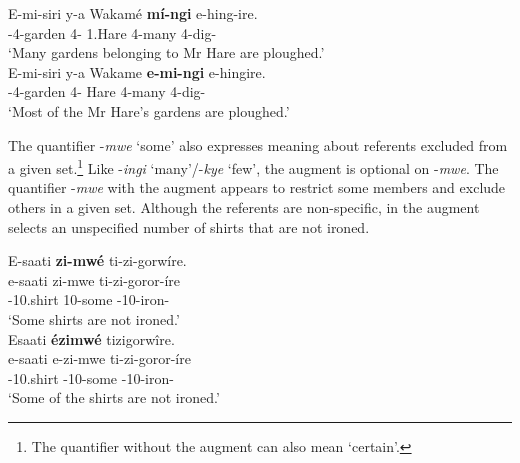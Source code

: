 \documentclass[output=paper]{langscibook}
\begin{document}
\ea
\label{bkm:Ref135724099}
\ea
\label{bkm:Ref135724099:a}
\gll
E-mi-siri  y-a  Wakamé  \textbf{mí-ngi}  e-hing-ire.\\
\AUG{}-4-garden  4-\CONN{}  1.Hare  4-many  4\SM{}-dig-\PFV{}\\
\glt
‘Many gardens belonging to Mr Hare are ploughed.’\\


\ex
\label{bkm:Ref135724099:b}
\gll
E-mi-siri  y-a  Wakame  \textbf{e-mi-ngi}  e-hingire.\\
\AUG{}-4-garden  4-\CONN{}  Hare  4-many  4\SM{}-dig-\PFV{}\\
\glt
‘Most of the Mr Hare’s gardens are ploughed.’\\


\z
\z

The quantifier -\textit{mwe} ‘some’ also expresses meaning about referents excluded from a given set.\footnote{The quantifier without the augment can also mean ‘certain’.} Like -\textit{ingi} ‘many’/-\textit{kye} ‘few’, the augment is optional on -\textit{mwe}. The quantifier -\textit{mwe} with the augment appears to restrict some members and exclude others in a given set. Although the referents are non-specific, in  the augment selects an unspecified number of shirts that are not ironed.

\ea
\label{bkm:Ref111494382}
\ea
\label{bkm:Ref111494382:a} 
E-saati \textbf{zi-mwé} ti-zi-gorwíre.\\
\gll
    e-saati  zi-mwe  ti-zi-goror-íre\\
\AUG{}-10.shirt  10-some  \NEG{}-10\SM{}-iron-\IPFV{}\\
\glt
    \glt ‘Some shirts are not ironed.’\\


\ex
\label{bkm:Ref111494382:b}
Esaati \textbf{ézimwé} tizigorwîre.\\
\gll
e-saati  e-zi-mwe  ti-zi-goror-íre\\
\AUG{}-10.shirt  \AUG{}-10-some  \NEG{}-10\SM{}-iron-\IPFV{}\\
\glt
‘Some of the shirts are not ironed.’\\


\z
\z
\end{document}

